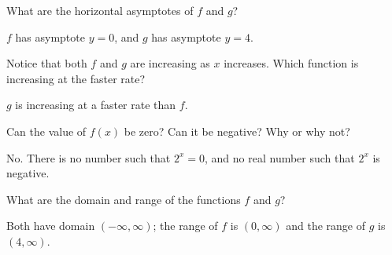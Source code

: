 \begin{exercises}
\begin{problem}
\begin{subproblem}
\begin{shortsolution}
	\end{shortsolution}
\end{subproblem}
\begin{subproblem}
	What are the horizontal asymptotes of $f$ and $g$?
	\begin{shortsolution}
		$f$ has asymptote $y=0$, and $g$ has asymptote $y=4$.
	\end{shortsolution}
\end{subproblem}
\begin{subproblem}
	Notice that both $f$ and $g$ are increasing as $x$ increases.  Which function is increasing at the faster rate?
	\begin{shortsolution}
		$g$ is increasing at a faster rate than $f$.
	\end{shortsolution}
\end{subproblem}
\begin{subproblem}
	Can the value of $f(x)$ be zero?  Can it be negative?  Why or why not?
	\begin{shortsolution}
		No. There is no number such that $2^x=0$, and no real number such that $2^x$ is negative.
	\end{shortsolution}
\end{subproblem}
\begin{subproblem}
	What are the domain and range of the functions $f$ and $g$?
	\begin{shortsolution}
		Both have domain $(-\infty,\infty)$; the range of $f$ is $(0,\infty)$ and the range of $g$ is $(4,\infty)$.
	\end{shortsolution}
\end{subproblem}
\end{problem}


\end{exercises}
